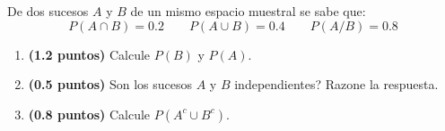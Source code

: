 
De dos sucesos \(A\) y \(B\) de un mismo espacio muestral se sabe que:
\[
P(A\cap B)=0.2\qquad P(A\cup B)=0.4\qquad P(A/B)=0.8
\]
\begin{enumerate}[label=\alph*),leftmargin=2.4em]
  \item \textbf{(1.2 puntos)} Calcule \(P(B)\) y \(P(A)\).
  \item \textbf{(0.5 puntos)} \textquestiondown{}Son los sucesos \(A\) y \(B\) independientes? Razone la respuesta.
  \item \textbf{(0.8 puntos)} Calcule \(P(A^c\cup B^c)\).
\end{enumerate}
